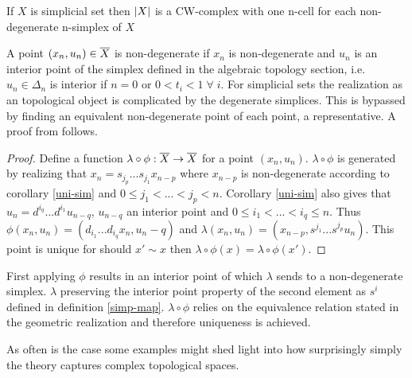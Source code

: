 \documentclass[../../main.tex]{subfiles}
\begin{document}
    \begin{proposition}\label{is-CW}
        If $X$ is simplicial set then $\geom[X]$ is a CW-complex with one n-cell for each non-degenerate n-simplex of $X$ 
    \end{proposition}

    A point $(x_n,u_n)\in \bigGeom X$ is non-degenerate if $x_n$ is non-degenerate and $u_n$ is an interior point of the simplex defined in the algebraic topology section, i.e. $u_n\in \Delta_n$ is interior if $ n=0$ or $ 0< t_i < 1 \;\forall\; i$. For simplicial sets the realization as an topological object is complicated by the degenerate simplices. This is bypassed by finding an equivalent non-degenerate point of each point, a representative. A proof from \cite{simp-maye} follows. 

    \begin{proof}    
        Define a function $\lambda\circ\phi:\bigGeom X \to \bigGeom X$ for a point $(x_n,u_n)$. $\lambda\circ\phi$ is generated by realizing that $x_n=s_{j_p}...s_{j_1}x_{n-p}$ where $x_{n-p}$ is non-degenerate according to corollary \ref{uni-sim} and $0\leq j_1<...<j_p<n$. Corollary \ref{uni-sim} also gives that $u_n=d^{i_q}...d^{i_1}u_{n-q}$, $u_{n-q}$ an interior point and $0\leq i_1<...<i_q\leq n$. Thus $\phi(x_n,u_n)=(d_{i_1}...d_{i_q}x_n,u_n-q)$ and $\lambda(x_n,u_n)=(x_{n-p},s^{j_1}...s^{j_p}u_n)$. This point is unique for should $x'\sim x$ then $\lambda\circ\phi(x)=\lambda\circ\phi(x')$.
    \end{proof}
    
    First applying $\phi$ results in an interior point of which $\lambda$ sends to a non-degenerate simplex. $\lambda$ preserving the interior point property of the second element as $s^i$ defined in definition \ref{simp-map}. $\lambda\circ\phi$ relies on the equivalence relation stated in the geometric realization and therefore uniqueness is achieved.  

    As often is the case some examples might shed light into how surprisingly simply the theory captures complex topological spaces.

\end{document}
